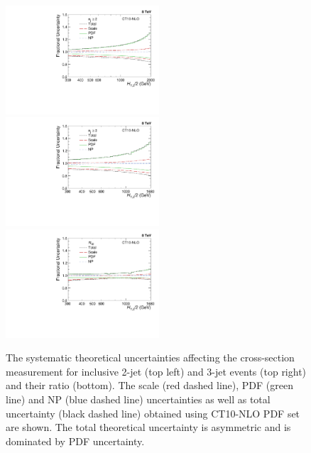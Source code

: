 \begin{figure}[!h]
 \begin{center}
 \hspace*{-5mm}\includegraphics[width=0.51\textwidth]{Plots_HT_2_150/Theory_Unc_2.pdf}%
 ~~\includegraphics[width=0.51\textwidth]{Plots_HT_2_150/Theory_Unc_3.pdf}\\
 \includegraphics[width=0.51\textwidth]{Plots_HT_2_150/Theory_Unc_Ratio_32.pdf}\\
 \caption{The systematic theoretical uncertainties affecting the cross-section measurement for inclusive 2-jet (top left) and 3-jet events (top right) and their ratio \ratio (bottom). The scale (red dashed line), PDF (green line) and NP (blue dashed line) uncertainties as well as total uncertainty (black dashed line) obtained using CT10-NLO PDF set are shown. The total theoretical uncertainty is asymmetric and is dominated by PDF uncertainty.}
 \label{fig:theory_unc}
 \end{center}
\end{figure}

